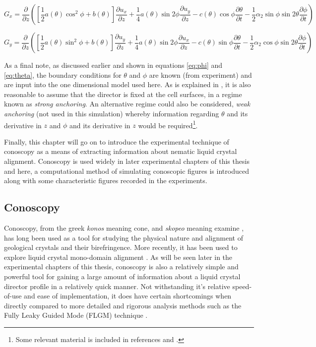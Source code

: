 \begin{equation}
G_x = \frac{\partial}{\partial z}\left(\left[\frac{1}{2}a\left(\theta\right)\cos^2\phi+b\left(\theta\right)\right]\frac{\partial u_x}{\partial z}
+\frac{1}{4}a\left(\theta\right)\sin2\phi\frac{\partial u_y}{\partial z}-c\left(\theta\right)\cos\phi\frac{\partial \theta}{\partial t}-\frac{1}{2}\alpha_2\sin\phi\sin2\theta\frac{\partial \phi}{\partial t}\right)
\label{eq:Gx}
\end{equation}



\begin{equation}
G_y = \frac{\partial}{\partial z}\left(\left[\frac{1}{2}a\left(\theta\right)\sin^2\phi+b\left(\theta\right)\right]\frac{\partial u_y}{\partial z}
+\frac{1}{4}a\left(\theta\right)\sin2\phi\frac{\partial u_x}{\partial z}-c\left(\theta\right)\sin\phi\frac{\partial \theta}{\partial t}-\frac{1}{2}\alpha_2\cos\phi\sin2\theta\frac{\partial \phi}{\partial t}\right)
\label{eq:Gy}
\end{equation}

\noindent As a final note, as discussed earlier and shown in equations \ref{eq:phi} and \ref{eq:theta}, the boundary conditions for $\theta$ and $\phi$ are known (from experiment) and are input into the one dimensional model used here. As is explained in \cite{Cornford2008}, it is also reasonable to assume that the director is fixed at the cell surfaces, in a regime known as \textit{strong anchoring}. An alternative regime could also be considered, \textit{weak anchoring} (not used in this simulation) whereby information regarding $\theta$ and its derivative in $z$ and $\phi$ and its derivative in $z$ would be required\footnote{Some relevant material is included in references \cite{Cui2006} and \cite{Choate2008}.}.

Finally, this chapter will go on to introduce the experimental technique of conoscopy as a means of extracting information about nematic liquid crystal alignment. Conoscopy is used widely in later experimental chapters of this thesis and here, a computational method of simulating conoscopic figures is introduced along with some characteristic figures recorded in the experiments.

\newpage
\subsection{Conoscopy}
Conoscopy, from the greek \textit{konos} meaning cone, and \textit{skopeo} meaning examine \cite{wikipedia}, has long been used as a tool for studying the physical nature and alignment of geological crystals and their birefringence. More recently, it has been used to explore liquid crystal mono-domain alignment \cite{Horn2001}. As will be seen later in the experimental chapters of this thesis, conoscopy is also a relatively simple and powerful tool for gaining a large amount of information about a liquid crystal director profile in a relatively quick manner. Not withstanding it's relative speed-of-use and ease of implementation, it does have certain shortcomings when directly compared to more detailed and rigorous analysis methods such as the Fully Leaky Guided Mode (FLGM) technique \cite{Cornford2009,Yang2007,Jewell2005a,Jewell2006,Jewell2007}.

